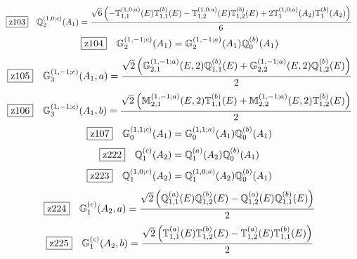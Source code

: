 \documentclass[fleqn,10pt,landscape]{jsarticle}
\begin{document}
\begin{dmath*}
\hspace*{3mm}\fbox{z103}\quad \mathbb{Q}_{2}^{(1,0;c)}(A_{1})=\frac{\sqrt{6} \left(- \mathbb{T}_{1,1}^{(1,0;a)}(E) \mathbb{T}_{1,1}^{(b)}(E) - \mathbb{T}_{1,2}^{(1,0;a)}(E) \mathbb{T}_{1,2}^{(b)}(E) + 2 \mathbb{T}_{1}^{(1,0;a)}(A_{2}) \mathbb{T}_{1}^{(b)}(A_{2})\right)}{6}
\end{dmath*}
\begin{dmath*}
\hspace*{3mm}\fbox{z104}\quad \mathbb{G}_{2}^{(1,-1;c)}(A_{1})=\mathbb{G}_{2}^{(1,-1;a)}(A_{1}) \mathbb{Q}_{0}^{(b)}(A_{1})
\end{dmath*}
\begin{dmath*}
\hspace*{3mm}\fbox{z105}\quad \mathbb{G}_{3}^{(1,-1;c)}(A_{1},a)=\frac{\sqrt{2} \left(\mathbb{G}_{2,1}^{(1,-1;a)}(E,2) \mathbb{Q}_{1,1}^{(b)}(E) + \mathbb{G}_{2,2}^{(1,-1;a)}(E,2) \mathbb{Q}_{1,2}^{(b)}(E)\right)}{2}
\end{dmath*}
\begin{dmath*}
\hspace*{3mm}\fbox{z106}\quad \mathbb{G}_{3}^{(1,-1;c)}(A_{1},b)=\frac{\sqrt{2} \left(\mathbb{M}_{2,1}^{(1,-1;a)}(E,2) \mathbb{T}_{1,1}^{(b)}(E) + \mathbb{M}_{2,2}^{(1,-1;a)}(E,2) \mathbb{T}_{1,2}^{(b)}(E)\right)}{2}
\end{dmath*}
\begin{dmath*}
\hspace*{3mm}\fbox{z107}\quad \mathbb{G}_{0}^{(1,1;c)}(A_{1})=\mathbb{G}_{0}^{(1,1;a)}(A_{1}) \mathbb{Q}_{0}^{(b)}(A_{1})
\end{dmath*}
\begin{dmath*}
\hspace*{3mm}\fbox{z222}\quad \mathbb{Q}_{1}^{(c)}(A_{2})=\mathbb{Q}_{1}^{(a)}(A_{2}) \mathbb{Q}_{0}^{(b)}(A_{1})
\end{dmath*}
\begin{dmath*}
\hspace*{3mm}\fbox{z223}\quad \mathbb{Q}_{1}^{(1,0;c)}(A_{2})=\mathbb{Q}_{1}^{(1,0;a)}(A_{2}) \mathbb{Q}_{0}^{(b)}(A_{1})
\end{dmath*}
\begin{dmath*}
\hspace*{3mm}\fbox{z224}\quad \mathbb{G}_{1}^{(c)}(A_{2},a)=\frac{\sqrt{2} \left(\mathbb{Q}_{1,1}^{(a)}(E) \mathbb{Q}_{1,2}^{(b)}(E) - \mathbb{Q}_{1,2}^{(a)}(E) \mathbb{Q}_{1,1}^{(b)}(E)\right)}{2}
\end{dmath*}
\begin{dmath*}
\hspace*{3mm}\fbox{z225}\quad \mathbb{G}_{1}^{(c)}(A_{2},b)=\frac{\sqrt{2} \left(\mathbb{T}_{1,1}^{(a)}(E) \mathbb{T}_{1,2}^{(b)}(E) - \mathbb{T}_{1,2}^{(a)}(E) \mathbb{T}_{1,1}^{(b)}(E)\right)}{2}
\end{dmath*}
\end{document}
